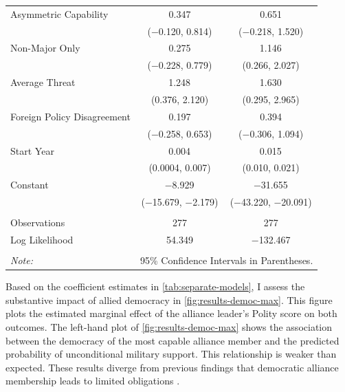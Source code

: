 \documentclass[12pt]{article}
\begin{document}
\begin{table}[!htbp]
\begin{tabular}{@{\extracolsep{5pt}}lcc}
  Asymmetric Capability & 0.347 & 0.651 \\ 
  & ($-$0.120, 0.814) & ($-$0.218, 1.520) \\ 
  Non-Major Only & 0.275 & 1.146$^{}$ \\ 
  & ($-$0.228, 0.779) & (0.266, 2.027) \\ 
  Average Threat & 1.248$^{}$ & 1.630$^{}$ \\ 
  & (0.376, 2.120) & (0.295, 2.965) \\ 
  Foreign Policy Disagreement & 0.197 & 0.394 \\ 
  & ($-$0.258, 0.653) & ($-$0.306, 1.094) \\ 
  Start Year & 0.004$^{}$ & 0.015$^{}$ \\ 
  & (0.0004, 0.007) & (0.010, 0.021) \\ 
  Constant & $-$8.929$^{}$ & $-$31.655$^{}$ \\ 
  & ($-$15.679, $-$2.179) & ($-$43.220, $-$20.091) \\ 
 \hline \\[-1.8ex] 
Observations & 277 & 277 \\ 
Log Likelihood & 54.349 & $-$132.467 \\ 
\hline 
\hline \\[-1.8ex] 
\textit{Note:}  & \multicolumn{2}{r}{95\% Confidence Intervals in Parentheses.} \\ 
\end{tabular} 
\end{table} 


Based on the coefficient estimates in \autoref{tab:separate-models}, I assess the substantive impact of allied democracy in \autoref{fig:results-democ-max}.
This figure plots the estimated marginal effect of the alliance leader's Polity score on both outcomes. 
The left-hand plot of \autoref{fig:results-democ-max} shows the association between the democracy of the most capable alliance member and the predicted probability of unconditional military support. 
This relationship is weaker than expected.  
These results diverge from previous findings that democratic alliance membership leads to limited obligations \citep{Mattes2012, Chibaetal2015}.
\end{document}
